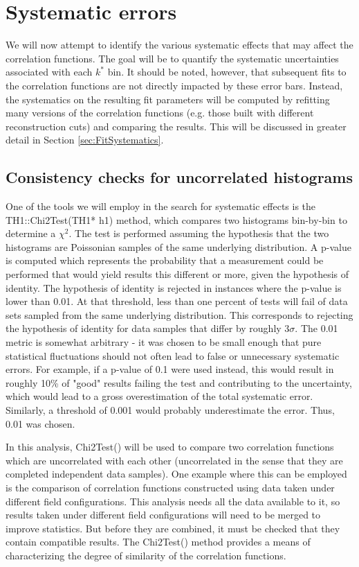 \section{Systematic errors}
\label{sec:GeneralCfSysErrorDiscussion}

We will now attempt to identify the various systematic effects that may affect the correlation functions.  The goal will be to quantify the systematic uncertainties associated with each $k^*$ bin.  It should be noted, however, that subsequent fits to the correlation functions are not directly impacted by these error bars.  Instead, the systematics on the resulting fit parameters will be computed by refitting many versions of the correlation functions (e.g. those built with different reconstruction cuts) and comparing the results. This will be discussed in greater detail in Section \ref{sec:FitSystematics}.

\subsection{Consistency checks for uncorrelated histograms}
\label{sec:ConsistencyCheckUncorrelated}
One of the tools we will employ in the search for systematic effects is the TH1::Chi2Test(TH1* h1) method, which compares two histograms bin-by-bin to determine a $\chi^2$.  The test is performed assuming the hypothesis that the two histograms are Poissonian samples of the same underlying distribution.  A p-value is computed which represents the probability that a measurement could be performed that would yield results this different or more, given the hypothesis of identity.  The hypothesis of identity is rejected in instances where the p-value is lower than 0.01. At that threshold, less than one percent of tests will fail of data sets sampled from the same underlying distribution.  This corresponds to rejecting the hypothesis of identity for data samples that differ by roughly $3 \sigma$.  The 0.01 metric is somewhat arbitrary - it was chosen to be small enough that pure statistical fluctuations should not often lead to false or unnecessary systematic errors.  For example, if a p-value of 0.1 were used instead, this would result in roughly 10\% of "good" results failing the test and contributing to the uncertainty, which would lead to a gross overestimation of the total systematic error.  Similarly, a threshold of 0.001 would probably underestimate the error.  Thus, 0.01 was chosen.

In this analysis, Chi2Test() will be used to compare two correlation functions which are uncorrelated with each other (uncorrelated in the sense that they are completed independent data samples).  One example where this can be employed is the comparison of correlation functions constructed using data taken under different field configurations.  This analysis needs all the data available to it, so results taken under different field configurations will need to be merged to improve statistics.  But before they are combined, it must be checked that they contain compatible results.  The Chi2Test() method provides a means of characterizing the degree of similarity of the correlation functions.  

